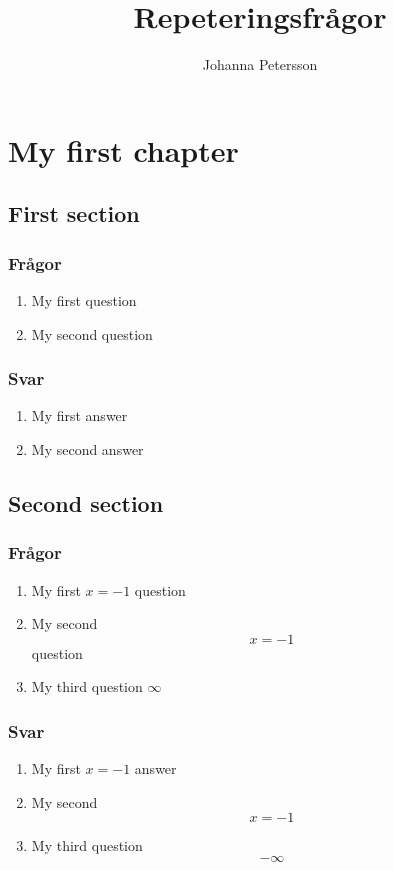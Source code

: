 \documentclass[11pt]{report}
\begin{document}
\title{Repeteringsfrågor}
\author{Johanna Petersson}
\maketitle

\chapter{My first chapter}
\section{First section}
\subsection{Frågor}
\begin{enumerate}
	\item My first question
	\item My second question
\end{enumerate}
\subsection{Svar}
\begin{enumerate}
	\item My first answer
	\item My second answer
\end{enumerate}

\section{Second section}
\subsection{Frågor}
\begin{enumerate}
	\item My first $x= - 1$ question
	\item My second \[ x= - 1 \] question
	\item My third question $\infty$
\end{enumerate}
\subsection{Svar}
\begin{enumerate}
	\item My first $x= - 1$ answer
	\item My second \[ x= - 1 \]
\item My third question \[ - \infty \]
\end{enumerate}
\end{document}
